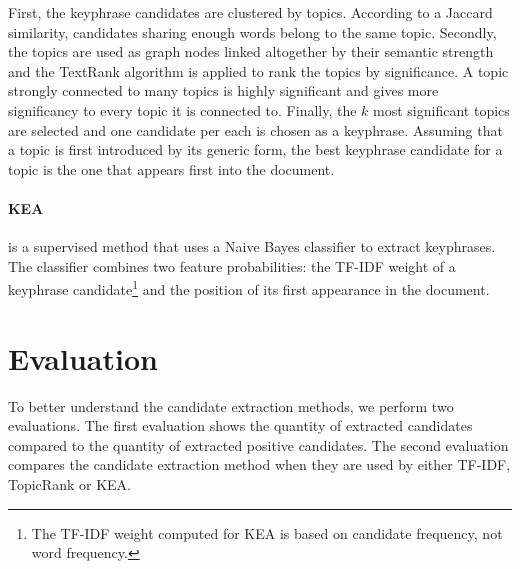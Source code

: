   First, the keyphrase candidates are clustered by topics. According to a
  Jaccard similarity, candidates sharing enough words belong to the same topic.
  Secondly, the topics are used as graph nodes linked altogether by their
  semantic strength and the TextRank algorithm is applied to rank the topics by
  significance. A topic strongly connected to many topics is highly significant
  and gives more significancy to every topic it is connected to. Finally, the
  $k$ most significant topics are selected and one candidate per each is chosen
  as a keyphrase. Assuming that a topic is first introduced by its generic form,
  the best keyphrase candidate for a topic is the one that appears first into
  the document.

  \paragraph{KEA~\textnormal{\cite{witten1999kea}}} is a supervised method that
  uses a Naive Bayes classifier to extract keyphrases. The classifier combines
  two feature probabilities: the TF-IDF weight of a keyphrase
  candidate\footnote{The TF-IDF weight computed for KEA is based on candidate
  frequency, not word frequency.} and the position of its first appearance in
  the document.

\section{Evaluation}
\label{sec:evaluation}
  To better understand the candidate extraction methods, we perform two
  evaluations. The first evaluation shows the quantity of extracted candidates
  compared to the quantity of extracted positive candidates. The second
  evaluation compares the candidate extraction method when they are used by
  either TF-IDF, TopicRank or KEA.


